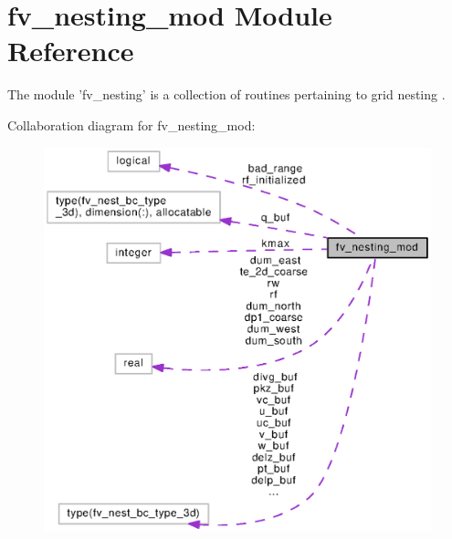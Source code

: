 \section{fv\-\_\-nesting\-\_\-mod Module Reference}
\label{classfv__nesting__mod}


The module 'fv\-\_\-nesting' is a collection of routines pertaining to grid nesting \cite{harris2013two}.  




Collaboration diagram for fv\-\_\-nesting\-\_\-mod\-:
\nopagebreak
\begin{figure}[H]
\begin{center}
\leavevmode
\includegraphics[width=350pt]{classfv__nesting__mod__coll__graph}
\end{center}
\end{figure}
